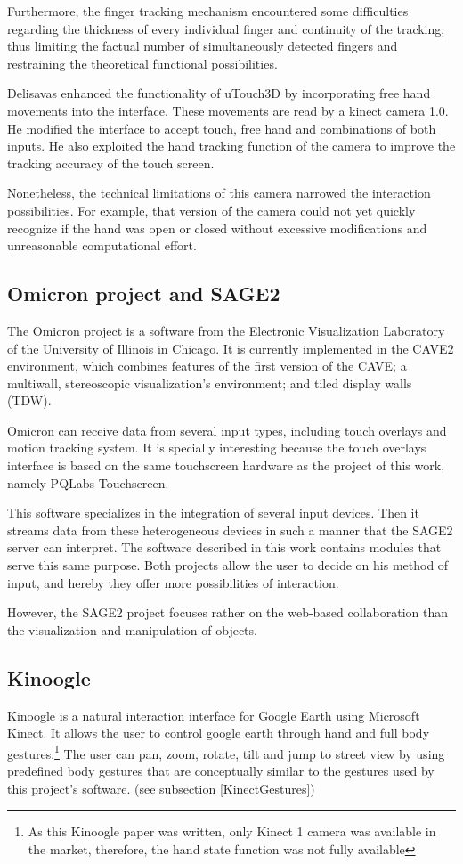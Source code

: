 \documentclass[12pt]{extarticle}
\begin{document}
Furthermore, the finger tracking mechanism encountered some difficulties regarding the thickness of every individual finger and continuity of the tracking, thus limiting the factual number of simultaneously detected fingers and restraining the theoretical functional possibilities.

Delisavas \cite{Deli13}enhanced the functionality of uTouch3D by incorporating free hand movements into the interface. These movements are read by a kinect camera 1.0. He modified the interface to accept touch, free hand and combinations of both inputs. He also exploited the hand tracking function of the camera to improve the tracking accuracy of the touch screen.

Nonetheless, the technical limitations of this camera narrowed the interaction possibilities. For example, that version of the camera could not yet quickly recognize if the hand was open or closed without excessive modifications and unreasonable computational effort.

\subsection {Omicron project and SAGE2}
The Omicron project is a software from the Electronic Visualization Laboratory of the University of Illinois in Chicago. It is currently implemented in the CAVE2 environment, which combines features of the first version of the CAVE; a multiwall, stereoscopic visualization's environment; and tiled display walls (TDW).

Omicron can receive data from several input types, including touch overlays and motion tracking system. It is specially interesting because the touch overlays interface is based on the same touchscreen hardware as the project of this work, namely PQLabs Touchscreen.

This software specializes in the integration of several input devices. Then it streams data from these heterogeneous devices in such a manner that the SAGE2 server can interpret\cite{SAGE2}. The software described in this work contains modules that serve this same purpose. Both projects allow the user to decide on his method of input, and hereby they offer more possibilities of interaction.

However, the SAGE2 project focuses rather on the web-based collaboration than the visualization and manipulation of objects.

\subsection {Kinoogle}\label{subsec: kinoogle}
Kinoogle\cite{Kinoogle} is a natural interaction interface for Google Earth using Microsoft Kinect. It allows the user to control google earth through hand and full body gestures.\footnote{As this Kinoogle paper was written, only Kinect 1 camera was available in the market, therefore, the hand state function was not fully available} The user can pan, zoom, rotate, tilt and jump to street view by using predefined body gestures that are conceptually similar to the gestures used by this project's software. (see subsection \ref{KinectGestures})
\end{document}
